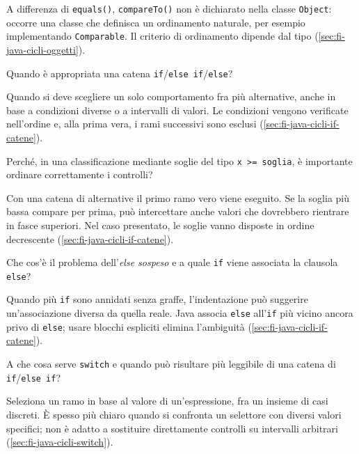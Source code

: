 A differenza di \texttt{equals()}, \texttt{compareTo()} non è
dichiarato nella classe \texttt{Object}: occorre una classe che
definisca un ordinamento naturale, per esempio implementando
\texttt{Comparable}. Il criterio di ordinamento dipende dal tipo
(\cref{sec:fi-java-cicli-oggetti}).

\begin{exercise}
\label{ex:fi-esercizi-java-cicli-catena-if}
Quando è appropriata una catena
\texttt{if}/\texttt{else if}/\texttt{else}?
\end{exercise}

Quando si deve scegliere un solo comportamento fra più alternative,
anche in base a condizioni diverse o a intervalli di valori.
Le condizioni vengono verificate nell'ordine e, alla prima vera,
i rami successivi sono esclusi
(\cref{sec:fi-java-cicli-if-catene}).

\begin{exercise}
\label{ex:fi-esercizi-java-cicli-soglie}
Perché, in una classificazione mediante soglie del tipo
\texttt{x >= soglia}, è importante ordinare correttamente i controlli?
\end{exercise}

Con una catena di alternative il primo ramo vero viene eseguito.
Se la soglia più bassa compare per prima, può intercettare anche
valori che dovrebbero rientrare in fasce superiori. Nel caso
presentato, le soglie vanno disposte in ordine decrescente
(\cref{sec:fi-java-cicli-if-catene}).

\begin{exercise}
\label{ex:fi-esercizi-java-cicli-else-sospeso}
Che cos'è il problema dell'\emph{else sospeso} e a quale
\texttt{if} viene associata la clausola \texttt{else}?
\end{exercise}

Quando più \texttt{if} sono annidati senza graffe, l'indentazione
può suggerire un'associazione diversa da quella reale. Java
associa \texttt{else} all'\texttt{if} più vicino ancora privo
di \texttt{else}; usare blocchi espliciti elimina l'ambiguità
(\cref{sec:fi-java-cicli-if-catene}).

\begin{exercise}
\label{ex:fi-esercizi-java-cicli-switch}
A che cosa serve \texttt{switch} e quando può risultare più
leggibile di una catena di \texttt{if}/\texttt{else if}?
\end{exercise}

Seleziona un ramo in base al valore di un'espressione, fra un
insieme di casi discreti. È spesso più chiaro quando si confronta
un selettore con diversi valori specifici; non è adatto a
sostituire direttamente controlli su intervalli arbitrari
(\cref{sec:fi-java-cicli-switch}).

